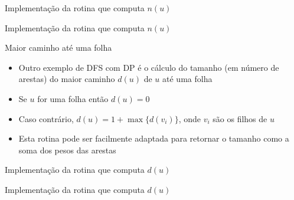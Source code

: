 \begin{frame}[fragile]{Implementação da rotina que computa $n(u)$}
\end{frame}

\begin{frame}[fragile]{Implementação da rotina que computa $n(u)$}
\end{frame}

\begin{frame}[fragile]{Maior caminho até uma folha}

    \begin{itemize}
        \item Outro exemplo de DFS com DP é o cálculo do tamanho (em número de arestas) do
            maior caminho $d(u)$ de $u$ até uma folha

        \item Se $u$ for uma folha então $d(u) = 0$

        \item Caso contrário, $d(u) = 1 + \max \lbrace d(v_i) \rbrace$, onde $v_i$ são os 
            filhos de $u$

        \item Esta rotina pode ser facilmente adaptada para retornar o tamanho como a soma dos
            pesos das arestas
    \end{itemize}

\end{frame}

\begin{frame}[fragile]{Implementação da rotina que computa $d(u)$}
\end{frame}

\begin{frame}[fragile]{Implementação da rotina que computa $d(u)$}
\end{frame}
